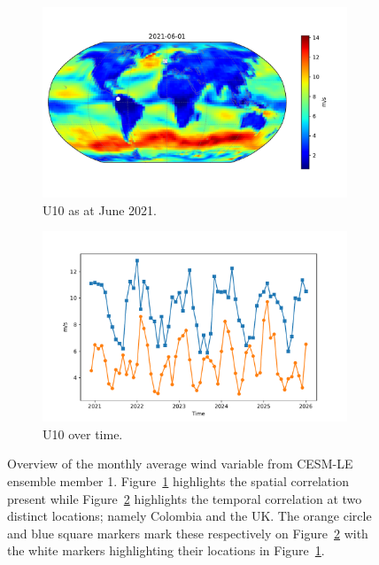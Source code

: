 \begin{figure}[htbp!] 
	\centering
	\begin{subfigure}[b]{0.45\textwidth}
		\includegraphics[width=\textwidth]{U10_example}
		\caption{U10 as at June 2021.}
		\label{fig:wind_june}   
	\end{subfigure}             
	\begin{subfigure}[b]{0.45\textwidth}
		\includegraphics[width=\textwidth]{U10_example_temp}
		\caption{U10 over time.}
		\label{fig:wind_temp}
	\end{subfigure}             
	\caption[Overview of the Wind variable from the CESM-LE dataset.]{Overview of the monthly average wind variable from CESM-LE ensemble member 1. Figure~\ref{fig:wind_june} highlights the spatial correlation present while Figure~\ref{fig:wind_temp} highlights the temporal correlation at two distinct locations; namely Colombia and the UK. The orange circle and blue square markers mark these respectively on Figure~\ref{fig:wind_temp} with the white markers highlighting their locations in Figure~\ref{fig:wind_june}.}
	\label{fig:wind_overview}
\end{figure}

